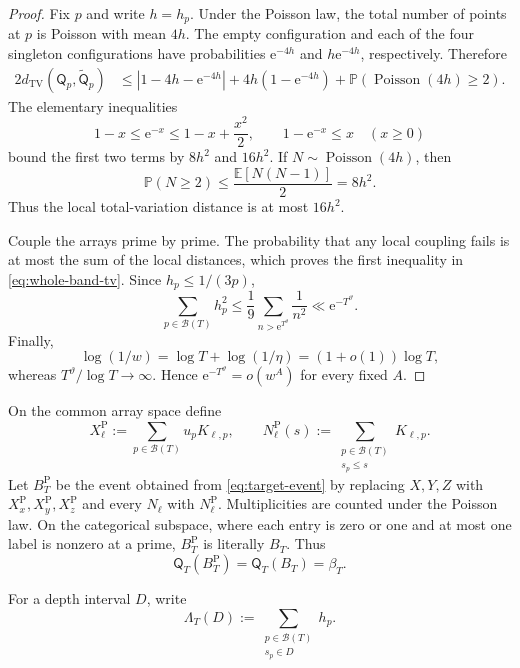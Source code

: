 \documentclass[11pt]{article}
\numberwithin{equation}{section}
\theoremstyle{plain}
\newcommand{\Pp}{\mathbb P}
\newcommand{\E}{\mathbb E}
\newcommand{\1}{\mathbf 1}
\newcommand{\e}{\mathrm e}
\newcommand{\cB}{\mathcal B}
\newcommand{\TV}{\operatorname{TV}}
\begin{document}
\begin{proof}
Fix $p$ and write $h=h_p$.  Under the Poisson law, the total number of
points at $p$ is Poisson with mean $4h$.  The empty configuration and each
of the four singleton configurations have probabilities
$\e^{-4h}$ and $h\e^{-4h}$, respectively.  Therefore
\begin{align*}
 2d_{\TV}(\mathsf Q_p,\widetilde{\mathsf Q}_p)
 &\le |1-4h-\e^{-4h}|
      +4h(1-\e^{-4h})
      +\Pp(\operatorname{Poisson}(4h)\ge2).
\end{align*}
The elementary inequalities
\[
 1-x\le\e^{-x}\le1-x+\frac{x^2}{2},
 \qquad
 1-\e^{-x}\le x
 \quad(x\ge0)
\]
bound the first two terms by $8h^2$ and $16h^2$.  If
$N\sim\operatorname{Poisson}(4h)$, then
\[
 \Pp(N\ge2)\le\frac{\E[N(N-1)]}{2}=8h^2.
\]
Thus the local total-variation distance is at most $16h^2$.

Couple the arrays prime by prime.  The probability that any local coupling
fails is at most the sum of the local distances, which proves the first
inequality in \eqref{eq:whole-band-tv}.  Since $h_p\le1/(3p)$,
\[
 \sum_{p\in\cB(T)}h_p^2
 \le\frac19\sum_{n>\e^{T^\vartheta}}\frac1{n^2}
 \ll\e^{-T^\vartheta}.
\]
Finally,
\[
 \log(1/w)=\log T+\log(1/\eta)=(1+o(1))\log T,
\]
whereas $T^\vartheta/\log T\to\infty$.  Hence
$\e^{-T^\vartheta}=o(w^A)$ for every fixed $A$.
\end{proof}

On the common array space define
\begin{equation}\label{eq:poisson-observables}
 X_\ell^{\mathrm P}:=\sum_{p\in\cB(T)}u_pK_{\ell,p},
 \qquad
 N_\ell^{\mathrm P}(s):=
 \sum_{\substack{p\in\cB(T)\\s_p\le s}}K_{\ell,p}.
\end{equation}
Let $B_T^{\mathrm P}$ be the event obtained from
\eqref{eq:target-event} by replacing $X,Y,Z$ with
$X_x^{\mathrm P},X_y^{\mathrm P},X_z^{\mathrm P}$ and every $N_\ell$
with $N_\ell^{\mathrm P}$.  Multiplicities are counted under the Poisson
law.  On the categorical subspace, where each entry is zero or one and at
most one label is nonzero at a prime, $B_T^{\mathrm P}$ is literally
$B_T$.  Thus
\begin{equation}\label{eq:event-identification}
 \mathsf Q_T(B_T^{\mathrm P})
 =\mathsf Q_T(B_T)=\beta_T.
\end{equation}

For a depth interval $D$, write
\[
 \Lambda_T(D):=
 \sum_{\substack{p\in\cB(T)\\s_p\in D}}h_p.
\]
\end{document}
